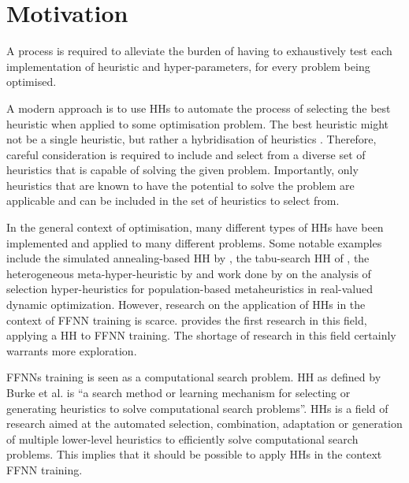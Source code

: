\section{Motivation}
\label{sec:introduction:motivation}

A process is required to alleviate the burden of having to exhaustively test
each implementation of heuristic and hyper-parameters, for every problem being
optimised.

A modern approach is to use \acp{HH} to automate the process of selecting the
best heuristic when applied to some optimisation problem. The best heuristic
might not be a single heuristic, but rather a hybridisation of heuristics
\cite{ref:pillay:2015}. Therefore, careful consideration is required to include and select from a diverse set of heuristics that is capable of solving the given problem. Importantly, only heuristics that are known to have the potential to solve the
problem are applicable and can be included in the set of heuristics to select from.


In the general context of optimisation, many different types of \acp{HH} have been implemented and applied to many
different problems. Some notable examples include the simulated annealing-based \ac{HH} by \citeauthor{ref:dowsland:2007} \cite{ref:dowsland:2007}, the tabu-search \ac{HH} of \citeauthor{ref:burke:2010} \cite{ref:burke:2010}, the heterogeneous meta-hyper-heuristic by \citeauthor{ref:grobler:2015} \cite{ref:grobler:2015} and work done by \citeauthor{ref:vanderstockt:2018} \cite{ref:vanderstockt:2018} on the analysis of selection hyper-heuristics for population-based metaheuristics in real-valued dynamic optimization. However, research on the application of \acp{HH} in the context of \acs{FFNN} training is scarce. \citeauthor{ref:nel:2021} \cite{ref:nel:2021} provides the first research in this field, applying a \acs{HH} to \acs{FFNN} training. The shortage of research in this field certainly warrants more exploration.

\acp{FFNN} training is seen as a computational search problem. \Acl{HH}
as defined by Burke et al. \cite{ref:burke:2010} is ``a search method or
learning mechanism for selecting or generating heuristics to solve computational
search problems''. \acp{HH} is a field of research aimed at the automated
selection, combination, adaptation or generation of multiple lower-level
heuristics to efficiently solve computational search problems. This implies that
it should be possible to apply \acp{HH} in the context \acs{FFNN} training.

